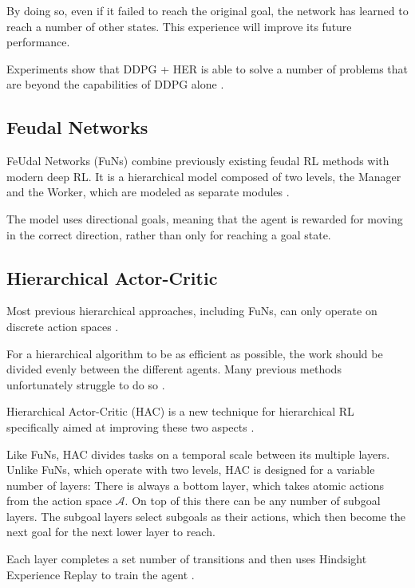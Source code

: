 \documentclass[runningheads]{llncs}
\begin{document}
By doing so, even if it failed to reach the original goal, the network has learned to reach a number of other states. This experience will improve its future performance.

Experiments show that DDPG + HER is able to solve a number of problems that are beyond the capabilities of DDPG alone \cite{andrychowicz2017hindsight}.

\subsection{Feudal Networks}

FeUdal Networks (FuNs) combine previously existing feudal RL methods \cite{dayan1993feudal} with modern deep RL. It is a hierarchical model composed of two levels, the Manager and the Worker, which are modeled as separate modules \cite{vezhnevets2017feudal}. 

The model uses directional goals, meaning that the agent is rewarded for moving in the correct direction, rather than only for reaching a goal state.

\subsection{Hierarchical Actor-Critic}

Most previous hierarchical approaches, including FuNs, can only operate on discrete action spaces \cite{levy2017hierarchical}.

For a hierarchical algorithm to be as efficient as possible, the work should be divided evenly between the different agents. Many previous methods unfortunately struggle to do so \cite{levy2017hierarchical}.

Hierarchical Actor-Critic (HAC) is a new technique for hierarchical RL specifically aimed at improving these two aspects \cite{levy2017hierarchical}.

Like FuNs, HAC divides tasks on a temporal scale between its multiple layers. Unlike FuNs, which operate with two levels, HAC is designed for a variable number of layers: There is always a bottom layer, which takes atomic actions from the action space $\mathcal{A}$. On top of this there can be any number of subgoal layers. The subgoal layers select subgoals as their actions, which then become the next goal for the next lower layer to reach.

Each layer completes a set number of transitions and then uses Hindsight Experience Replay to train the agent \cite{levy2017hierarchical}.
\end{document}
